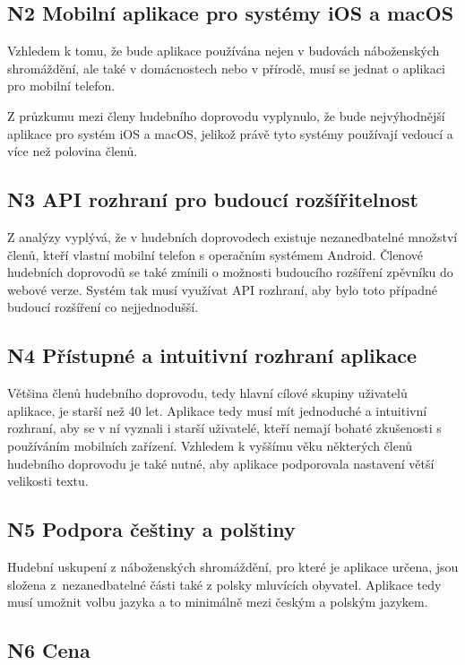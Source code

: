 \subsection{N2 Mobilní aplikace pro systémy iOS a macOS}

Vzhledem k tomu, že bude aplikace používána nejen v budovách náboženských shromáždění, ale také v domácnostech nebo v přírodě, musí se jednat o aplikaci pro mobilní telefon.

Z průzkumu mezi členy hudebního doprovodu vyplynulo, že bude nejvýhodnější aplikace pro systém iOS a macOS, jelikož právě tyto systémy používají vedoucí a více než polovina členů.

\subsection{N3 API rozhraní pro budoucí rozšířitelnost}

Z analýzy vyplývá, že v hudebních doprovodech existuje nezanedbatelné množství členů, kteří vlastní mobilní telefon s operačním systémem Android. Členové hudebních doprovodů se také zmínili o možnosti budoucího rozšíření zpěvníku do webové verze. Systém tak musí využívat API rozhraní, aby bylo toto případné budoucí rozšíření co nejjednodušší.

\subsection{N4 Přístupné a intuitivní rozhraní aplikace}

Většina členů hudebního doprovodu, tedy hlavní cílové skupiny uživatelů aplikace, je starší než 40 let. Aplikace tedy musí mít jednoduché a intuitivní rozhraní, aby se v ní vyznali i starší uživatelé, kteří nemají bohaté zkušenosti s používáním mobilních zařízení. Vzhledem k vyššímu věku některých členů hudebního doprovodu je také nutné, aby aplikace podporovala nastavení větší velikosti textu.

\subsection{N5 Podpora češtiny a polštiny}

Hudební uskupení z náboženských shromáždění, pro které je aplikace určena, jsou složena z~nezanedbatelné části také z polsky mluvících obyvatel. Aplikace tedy musí umožnit volbu jazyka a to minimálně mezi českým a polským jazykem.

\subsection{N6 Cena}

